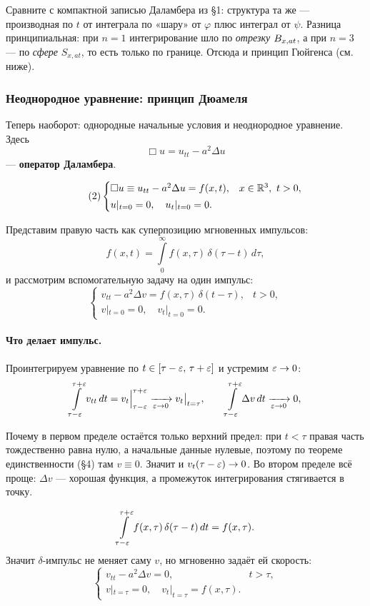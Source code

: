 \begin{idea}
Сравните с компактной записью Даламбера из \S1: структура та же — производная по
$t$ от интеграла по «шару» от $\varphi$ плюс интеграл от $\psi$. Разница
принципиальная: при $n=1$ интегрирование шло по \emph{отрезку}
$B_{x,at}$, а при $n=3$ — по \emph{сфере} $S_{x,at}$, то есть только по
границе. Отсюда и принцип Гюйгенса (см. ниже).
\end{idea}

\subsubsection*{Неоднородное уравнение: принцип Дюамеля}

Теперь наоборот: однородные начальные условия и неоднородное уравнение. Здесь
\[
  \Box u = u_{tt} - a^2 \Delta u
\]
— \textbf{оператор Даламбера}.

\begin{equation}\tag{2}\label{eq:wave3-forced}
  \begin{cases}
    \Box u \equiv u_{tt} - a^2 \Delta u = f(x,t), & x \in \mathbb{R}^3,\ t > 0, \\[2pt]
    u|_{t=0} = 0, \quad u_t|_{t=0} = 0 .
  \end{cases}
\end{equation}

Представим правую часть как суперпозицию мгновенных импульсов:
\[
  f(x,t) = \int\limits_0^{\infty} f(x,\tau)\, \delta(\tau - t)\, d\tau ,
\]
и рассмотрим вспомогательную задачу на один импульс:
\[
  \begin{cases}
    v_{tt} - a^2 \Delta v = f(x,\tau)\,\delta(t - \tau), & t > 0, \\[2pt]
    v|_{t=0} = 0, \quad v_t|_{t=0} = 0 .
  \end{cases}
\]

\paragraph{Что делает импульс.} Проинтегрируем уравнение по
$t \in [\tau-\varepsilon,\, \tau+\varepsilon]$ и устремим $\varepsilon \to 0$:
\[
  \int\limits_{\tau-\varepsilon}^{\tau+\varepsilon} v_{tt}\, dt
  = v_t \Big|_{\tau-\varepsilon}^{\tau+\varepsilon}
  \xrightarrow[\varepsilon \to 0]{} v_t\big|_{t=\tau} ,
  \qquad
  \int\limits_{\tau-\varepsilon}^{\tau+\varepsilon} \Delta v\, dt
  \xrightarrow[\varepsilon \to 0]{} 0 ,
\]
\begin{idea}
Почему в первом пределе остаётся только верхний предел: при $t < \tau$ правая
часть тождественно равна нулю, а начальные данные нулевые, поэтому по теореме
единственности (\S4) там $v \equiv 0$. Значит и $v_t(\tau - \varepsilon) \to 0$.
Во втором пределе всё проще: $\Delta v$ — хорошая функция, а промежуток
интегрирования стягивается в точку.
\end{idea}
\[
  \int\limits_{\tau-\varepsilon}^{\tau+\varepsilon} f(x,\tau)\,\delta(\tau - t)\, dt
  = f(x,\tau) .
\]
Значит $\delta$-импульс не меняет саму $v$, но мгновенно задаёт ей скорость:
\[
  \begin{cases}
    v_{tt} - a^2 \Delta v = 0, & t > \tau, \\[2pt]
    v|_{t=\tau} = 0, \quad v_t|_{t=\tau} = f(x,\tau) .
  \end{cases}
\]

